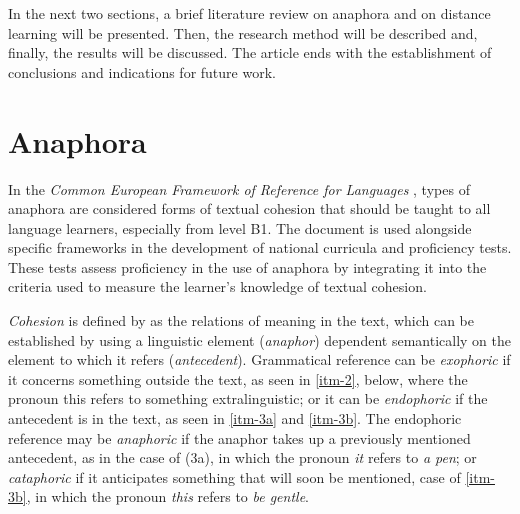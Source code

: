 \documentclass{textolivre}
\begin{document}
In the next two sections, a brief literature review on anaphora and on distance
learning will be presented. Then, the research method will be described and,
finally, the results will be discussed. The article ends with the establishment
of conclusions and indications for future work.

\section{Anaphora}\label{sec-anaphora}
In the \emph{Common European Framework of Reference for Languages} \cite[p.~140]{council_of_europe_common_2009},
types of anaphora are considered forms of textual cohesion that
should be taught to all language learners, especially from level B1. The
document is used alongside specific frameworks in the development of national
curricula and proficiency tests. These tests assess proficiency in the use of
anaphora by integrating it into the criteria used to measure the learner's
knowledge of textual cohesion.

\emph{Cohesion} is defined by \textcite[p.~4]{halliday_cohesion_1976} as the relations
of meaning in the text, which can be established by using a linguistic element
(\emph{anaphor}) dependent semantically on the element to which it refers
(\emph{antecedent}). Grammatical reference can be \emph{exophoric} if it concerns something
outside the text, as seen in \ref{itm-2}, below, where the pronoun this refers to
something extralinguistic; or it can be \emph{endophoric} if the antecedent is in the
text, as seen in \ref{itm-3a} and \ref{itm-3b}. The endophoric reference may be \emph{anaphoric} if
the anaphor takes up a previously mentioned antecedent, as in the case of (3a),
in which the pronoun \emph{it} refers to \emph{a pen}; or \emph{cataphoric} if it anticipates
something that will soon be mentioned, case of \ref{itm-3b}, in which the pronoun \emph{this}
refers to \emph{be gentle}.

%
%
\end{document}
